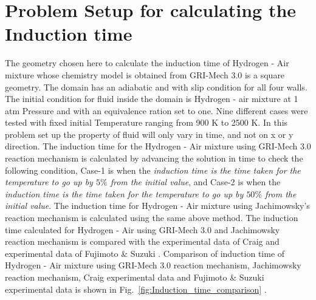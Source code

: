 \documentclass{warpdoc}
\begin{document}
\section{Problem Setup for calculating the Induction time}
The geometry chosen here to calculate the induction time of Hydrogen - Air mixture whose chemistry model is obtained from GRI-Mech 3.0 \cite{GRImech} is a square geometry. The domain has an adiabatic and with slip condition for all four walls. The initial condition for fluid inside the domain is Hydrogen - air mixture at 1 atm Pressure and with an equivalence ration set to one. Nine different cases were tested with fixed initial Temperature ranging from 900 K to 2500 K. In this problem set up the property of fluid will only vary in time, and not on x or y direction. The induction time for the Hydrogen - Air mixture using GRI-Mech 3.0 reaction mechanism is calculated by advancing the solution in time to check the following condition, Case-1 is when the \textit{induction time is the time taken for the temperature to go up by $5\%$ from the initial value}, and Case-2 is when the \textit{induction time is the time taken for the temperature to go up by $50\%$ from the initial value}. The induction time for Hydrogen - Air mixture using Jachimowsky's reaction mechanism \cite{nasa:1988:jachimowski} is calculated using the same above method. The induction time calculated for Hydrogen - Air using GRI-Mech 3.0 and Jachimowsky reaction mechanism is compared with the experimental data of Craig \cite{AFAPL:1966:craig} and experimental data of Fujimoto \& Suzuki \cite{fujimoto1967memoirs}. Comparison of induction time of Hydrogen - Air mixture using GRI-Mech 3.0 reaction mechanism, Jachimowsky reaction mechanism, Craig experimental data and Fujimoto \& Suzuki experimental data is shown in Fig.\ \ref{fig:Induction_time_comparison} .
\end{document}
